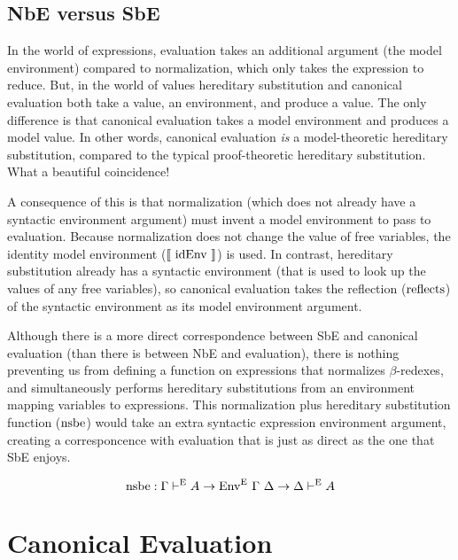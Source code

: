 \documentclass{llncs}
\def\cross{\times}
\def\marr{\rightarrow}
\def\reflecte{\fun{reflects}}
\def\nsbe{\fun{nsbe}}
\def\midenv{\el{\fun{idEnv}}}
\newcommand{\turn}[1]{\vdash^\con{#1}}
\newcommand{\el}[1]{\llbracket ~ #1 ~ \rrbracket}
\newcommand{\con}[1]{\textmd{#1}}
\newcommand{\fun}[1]{\textmd{#1}}
\newcommand{\dtypm}[1]{\el{\Delta \vdash #1}}
\newcommand{\type}[1]{\Gamma \turn{E} #1}
\newcommand{\dtype}[1]{\Delta \turn{E} #1}
\newcommand{\typv}[1]{\Gamma \turn{V} #1}
\newcommand{\dtypv}[1]{\Delta \turn{V} #1}
\def\env{\fun{Env}~\Gamma~\Delta}
\def\enve{\fun{Env}^\con{E}~\Gamma~\Delta}
\begin{document}
\subsection{NbE versus SbE}

In the world of expressions,
evaluation takes an additional argument (the model environment) compared
to normalization, which only takes the expression to reduce. But, in
the world of values hereditary substitution and canonical evaluation
both take a value, an environment, and produce a value. The only
difference is that canonical evaluation takes a model environment and
produces a model value. 
In other words, canonical evaluation \textit{is}
a model-theoretic hereditary substitution, compared to the typical
proof-theoretic hereditary substitution.
What a beautiful coincidence!

A consequence of this is that normalization (which does not already
have a syntactic environment argument) must invent a model
environment to pass to evaluation. Because normalization does not
change the value of free variables, the identity model environment
($\midenv$) is used. In contrast, hereditary substitution already has
a syntactic environment (that is used to look up the values of any free
variables), so canonical evaluation takes the 
reflection ($\reflecte$) of the syntactic environment as its model
environment argument.

Although there is a more direct correspondence between SbE and canonical
evaluation (than there is between NbE and evaluation), there is
nothing preventing us from defining a function on expressions that
normalizes $\beta$-redexes, and simultaneously performs hereditary
substitutions from an environment mapping variables to expressions.
This normalization plus hereditary substitution function ($\nsbe$) would take an
extra syntactic expression environment argument, creating a
corresponcence with evaluation that is just as direct as the one that
SbE enjoys.

$$
\nsbe : \type{A} \marr \enve \marr \dtype{A}
$$


\section{Canonical Evaluation}
\label{sec:vmod}

\end{document}

